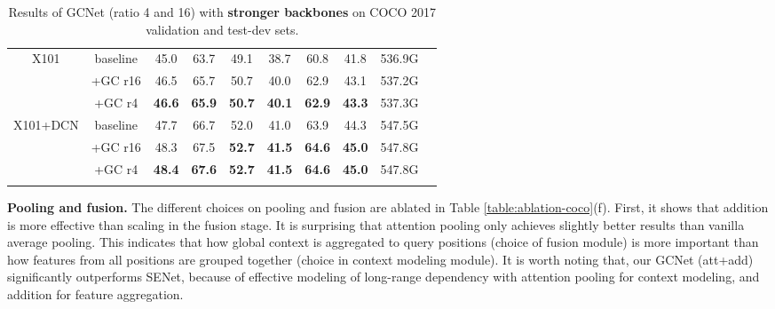 \documentclass[10pt,twocolumn,letterpaper]{article}
\begin{document}
\begin{table}[t]
\begin{tabular}[t]{cc|ccc|ccc|cc}
    
    \multirow{2}{*}{X101}             & baseline & 45.0 & 63.7	& 49.1 & 38.7 & 60.8 & 41.8 & 536.9G \\
    \multirow{2}{*}{+Cascade}         & +GC r16 & 46.5 & 65.7 & 50.7 & 40.0 & 62.9 & 43.1 & 537.2G \\
                                      & +GC r4 & \textbf{46.6} & \textbf{65.9} & \textbf{50.7} & \textbf{40.1} & \textbf{62.9} & \textbf{43.3} & 537.3G \\
    \hline
    \multirow{2}{*}{X101+DCN}         & baseline & 47.7 & 66.7 & 52.0 & 41.0 & 63.9 & 44.3 & 547.5G \\
    \multirow{2}{*}{+Cascade}         & +GC r16 & 48.3 & 67.5 & \textbf{52.7} & \textbf{41.5} & \textbf{64.6} & \textbf{45.0} & 547.8G \\
                                      & +GC r4 & \textbf{48.4} & \textbf{67.6} & \textbf{52.7} & \textbf{41.5} & \textbf{64.6} & \textbf{45.0} & 547.8G \\
    \Xhline{1.0pt}
    \end{tabular}
	\vspace{-8pt}
    \caption{Results of GCNet (ratio 4 and 16) with \textbf{stronger backbones} on COCO 2017 validation and test-dev sets.}
	\label{table:archs-coco}
	\vspace{-10pt}
  \end{table}

\textbf{Pooling and fusion.}
The different choices on pooling and fusion are ablated in Table \ref{table:ablation-coco}(f).
First, it shows that addition is more effective than scaling in the fusion stage.
It is surprising that attention pooling only achieves slightly better results than vanilla average pooling.
This indicates that how global context is aggregated to query positions (choice of fusion module) is more important than how features from all positions are grouped together (choice in context modeling module).
It is worth noting that, our GCNet (att+add) significantly outperforms SENet, because of effective modeling of long-range dependency with attention pooling for context modeling, and addition for feature aggregation.
\end{document}
